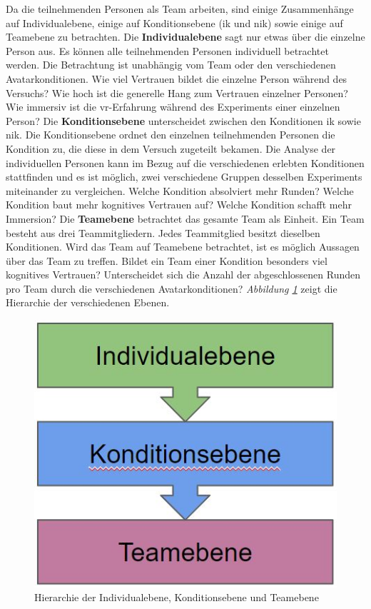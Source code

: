 \documentclass[a4paper,11pt]{article}%
\renewcommand{\\}{\vspace*{0.5\baselineskip} \newline}
\begin{document}
Da die teilnehmenden Personen als Team arbeiten, sind einige Zusammenhänge auf Individualebene, einige auf Konditionsebene (\ac{ik} und \ac{nik}) sowie einige auf Teamebene zu betrachten.\\
Die \textbf{Individualebene} sagt nur etwas über die einzelne Person aus. Es können alle teilnehmenden Personen individuell betrachtet werden. Die Betrachtung ist unabhängig vom Team oder den verschiedenen Avatarkonditionen. Wie viel Vertrauen bildet die einzelne Person während des Versuchs? Wie hoch ist die generelle Hang zum Vertrauen einzelner Personen? Wie immersiv ist die \ac{vr}-Erfahrung während des Experiments einer einzelnen Person?\\
Die \textbf{Konditionsebene} unterscheidet zwischen den Konditionen \ac{ik} sowie \ac{nik}. Die Konditionsebene ordnet den einzelnen teilnehmenden Personen die Kondition zu, die diese in dem Versuch zugeteilt bekamen. Die Analyse der individuellen Personen kann im Bezug auf die verschiedenen erlebten Konditionen stattfinden und es ist möglich, zwei verschiedene Gruppen desselben Experiments miteinander zu vergleichen. Welche Kondition absolviert mehr Runden? Welche Kondition baut mehr kognitives Vertrauen auf? Welche Kondition schafft mehr Immersion?\\
Die \textbf{Teamebene} betrachtet das gesamte Team als Einheit. Ein Team besteht aus drei Teammitgliedern. Jedes Teammitglied besitzt dieselben Konditionen. Wird das Team auf Teamebene betrachtet, ist es möglich Aussagen über das Team zu treffen. Bildet ein Team einer Kondition besonders viel kognitives Vertrauen? Unterscheidet sich die Anzahl der abgeschlossenen Runden pro Team durch die verschiedenen Avatarkonditionen?\\
\textit{Abbildung \ref{DifferentLevels}} zeigt die Hierarchie der verschiedenen Ebenen.


\begin{figure}[H]
		\begin{footnotesize}
		\centering
			\includegraphics[scale=0.4]{Abbildungen/DifferentLevels.JPG}\\
			\caption[Abbildung 1]{Hierarchie der Individualebene, Konditionsebene und Teamebene}
			\label{DifferentLevels}
		\end{footnotesize}
	\end{figure}
\end{document}
